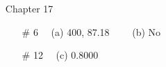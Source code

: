 \documentclass[12pt]{article}
\begin{document}
\begin{itemize}
\item[] Chapter 17           \label{ANS_17}
	\begin{itemize}
	\item[\# 6]   \ \  (a)  400, 87.18 \ \ \ \ (b) No \ \ \ \ 
	\item[\# 12]   \ \  (c) 0.8000
	\end{itemize}
%
%
%
%
%
%	
%	
%	
%
%
%



\end{itemize}  %
\end{document}
